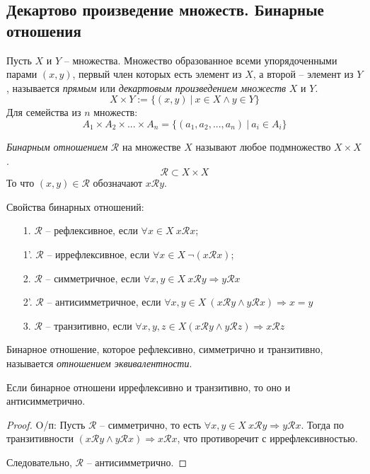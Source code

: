 \subsection{Декартово произведение множеств. Бинарные отношения}
\begin{definition}
Пусть $X$ и $Y$ -- множества. Множество образованное всеми упорядоченными парами $(x,y)$, первый член которых есть элемент из $X$, а второй -- элемент из $Y$, называется \textit{прямым} или \textit{декартовым произведением множеств} $X$ и $Y$.
$$X \times Y := \{(x, y) \ \vert \ x \in X \wedge y \in Y\}$$
Для семейства из $n$ множеств:
$$A_1 \times A_2 \times ... \times A_n = \{(a_1, a_2, ..., a_n) \ \vert \ a_i \in A_i\}$$
\end{definition}
\begin{definition}
\textit{Бинарным отношением} $\mathcal{R}$ на множестве $X$ называют любое подмножество $X \times X$.
$$\mathcal{R} \subset X \times X$$
То что $(x, y) \in \mathcal{R}$ обозначают $x \mathcal{R} y$.
\end{definition}
Свойства бинарных отношений:
\begin{itemize}
\item[1.] $\mathcal{R}$ -- рефлексивное, если $\forall x \in X \ x \mathcal{R} x$;
\item[1'.] $\mathcal{R}$ -- иррефлексивное, если $\forall x \in X \ \neg (x \mathcal{R} x)$;
\item[2.] $\mathcal{R}$ -- симметричное, если $\forall x,y \in X \ x \mathcal{R} y \Rightarrow y \mathcal{R} x$
\item[2'.] $\mathcal{R}$ -- антисимметричное, если $\forall x,y \in X \ (x \mathcal{R} y \wedge y \mathcal{R} x) \Rightarrow x = y$
\item[3.] $\mathcal{R}$ -- транзитивно, если $\forall x, y, z \in X (x \mathcal{R} y \wedge y \mathcal{R} z) \Rightarrow x \mathcal{R} z$
\end{itemize}
\begin{definition}
Бинарное отношение, которое рефлексивно, симметрично и транзитивно, называется \textit{отношением эквивалентности}.
\end{definition}
\begin{statement}
Если бинарное отношени иррефлексивно и транзитивно, то оно и антисимметрично.
\end{statement}
\begin{proof}
O/п: Пусть $\mathcal{R}$ -- симметрично, то есть $\forall x,y \in X \ x \mathcal{R} y \Rightarrow y \mathcal{R} x$. Тогда по транзитивности
$(x \mathcal{R} y \wedge y \mathcal{R} x) \Rightarrow x \mathcal{R} x$, что противоречит с иррефлексивностью.

Следовательно, $\mathcal{R}$ -- антисимметрично.
\end{proof}

